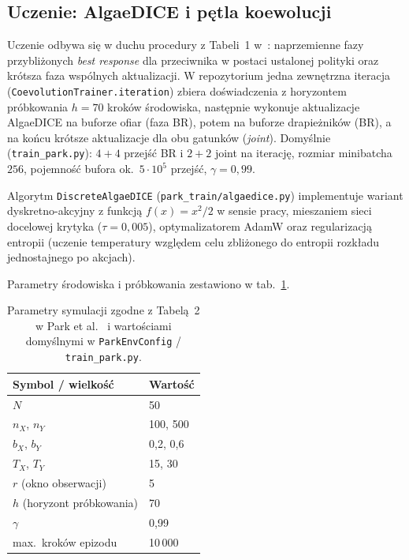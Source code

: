 \documentclass[polish]{template/projectreport}
\begin{document}
\subsection{Uczenie: AlgaeDICE i pętla koewolucji}
\label{sec:uczenie}

Uczenie odbywa się w duchu procedury z Tabeli~1 w~\cite{park2021}: naprzemienne fazy przybliżonych \emph{best response} dla przeciwnika w postaci ustalonej polityki oraz krótsza faza wspólnych aktualizacji. W repozytorium jedna zewnętrzna iteracja (\texttt{CoevolutionTrainer.iteration}) zbiera doświadczenia z horyzontem próbkowania \(h=70\) kroków środowiska, następnie wykonuje aktualizacje AlgaeDICE na buforze ofiar (faza BR), potem na buforze drapieżników (BR), a na końcu krótsze aktualizacje dla obu gatunków (\emph{joint}). Domyślnie (\texttt{train\_park.py}): \(4{+}4\) przejść BR i \(2{+}2\) joint na iterację, rozmiar minibatcha \(256\), pojemność bufora ok.\ \(5\cdot 10^5\) przejść, \(\gamma=0{,}99\).

Algorytm \texttt{DiscreteAlgaeDICE} (\texttt{park\_train/algaedice.py}) implementuje wariant dyskretno-akcyjny z funkcją \(f(x)=x^2/2\) w sensie pracy, mieszaniem sieci docelowej krytyka (\(\tau=0{,}005\)), optymalizatorem AdamW oraz regularizacją entropii (uczenie temperatury względem celu zbliżonego do entropii rozkładu jednostajnego po akcjach).

Parametry środowiska i próbkowania zestawiono w tab.~\ref{tab:param}.

\begin{table}[htbp]
  \centering
  \caption{Parametry symulacji zgodne z Tabelą~2 w Park et al.~\cite{park2021} i wartościami domyślnymi w \texttt{ParkEnvConfig} / \texttt{train\_park.py}.}
  \label{tab:param}
  \begin{tabular}{@{}ll@{}}
    \toprule
    Symbol / wielkość & Wartość \\
    \midrule
    \(N\) & 50 \\
    \(n_X\), \(n_Y\) & 100, 500 \\
    \(b_X\), \(b_Y\) & 0{,}2, 0{,}6 \\
    \(T_X\), \(T_Y\) & 15, 30 \\
    \(r\) (okno obserwacji) & 5 \\
    \(h\) (horyzont próbkowania) & 70 \\
    \(\gamma\) & 0{,}99 \\
    max.\ kroków epizodu & 10\,000 \\
    \bottomrule
  \end{tabular}
\end{table}
\end{document}

